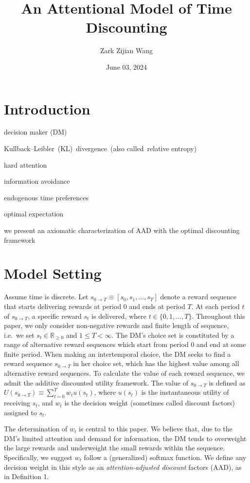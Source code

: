 \documentclass[
  12pt,
]{article}
\title{An Attentional Model of Time Discounting}
\author{Zark Zijian Wang}
\date{June 03, 2024}
\begin{document}
\maketitle

\hypertarget{introduction}{%
\section{Introduction}\label{introduction}}

decision maker (DM)

Kullback--Leibler~(KL)~divergence~(also called~relative entropy)

hard attention

information avoidance

endogenous time preferences

optimal expectation

we present an axiomatic characterization of AAD with the optimal
discounting framework

\hypertarget{model-setting}{%
\section{Model Setting}\label{model-setting}}

Assume time is discrete. Let
\(s_{0\rightarrow T}\equiv[s_0,s_1,...,s_T]\) denote a reward sequence
that starts delivering rewards at period 0 and ends at period \(T\). At
each period \(t\) of \(s_{0\rightarrow T}\), a specific reward \(s_t\)
is delivered, where \(t\in\{0,1,…,T\}\). Throughout this paper, we only
consider non-negative rewards and finite length of sequence, i.e.~we set
\(s_t \in \mathbb{R}_{\geq 0}\) and \(1\leq T<\infty\). The DM's choice
set is constituted by a range of alternative reward sequences which
start from period 0 and end at some finite period. When making an
intertemporal choice, the DM seeks to find a reward sequence
\(s_{0\rightarrow T}\) in her choice set, which has the highest value
among all alternative reward sequences. To calculate the value of each
reward sequence, we admit the additive discounted utility framework. The
value of \(s_{0\rightarrow T}\) is defined as
\(U(s_{0\rightarrow T})\equiv \sum_{t=0}^T w_{t}u(s_t)\), where
\(u(s_t)\) is the instantaneous utility of receiving \(s_t\), and
\(w_t\) is the decision weight (sometimes called discount factors)
assigned to \(s_t\).

The determination of \(w_t\) is central to this paper. We believe that,
due to the DM's limited attention and demand for information, the DM
tends to overweight the large rewards and underweight the small rewards
within the sequence. Specifically, we suggest \(w_t\) follow a
(generalized) softmax function. We define any decision weight in this
style as an \emph{attention-adjusted discount} factors (AAD), as in
Definition 1.
\end{document}

